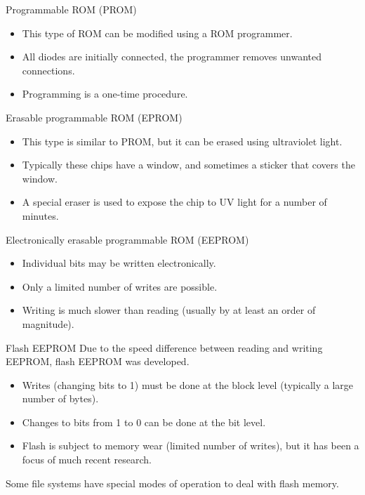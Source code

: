 \begin{frame}{Programmable ROM (PROM)}
  \begin{itemize}
    \item This type of ROM can be modified using a ROM programmer.
    \item All diodes are initially connected, the programmer removes unwanted connections.
    \item Programming is a one-time procedure.
  \end{itemize}
\end{frame}

\begin{frame}{Erasable programmable ROM (EPROM)}
  \begin{itemize}
    \item This type is similar to PROM, but it can be erased using ultraviolet light.
    \item Typically these chips have a window, and sometimes a sticker that covers the window.
    \item A special eraser is used to expose the chip to UV light for a number of minutes.
  \end{itemize}
\end{frame}

\begin{frame}{Electronically erasable programmable ROM (EEPROM)}
  \begin{itemize}
    \item Individual bits may be written electronically.
    \item Only a limited number of writes are possible.
    \item Writing is much slower than reading (usually by at least an order of magnitude).
  \end{itemize}
\end{frame}

\begin{frame}{Flash EEPROM}
  Due to the speed difference between reading and writing EEPROM, flash EEPROM was developed.
  \begin{itemize}
    \item Writes (changing bits to 1) must be done at the block level (typically a large number of bytes).
    \item Changes to bits from 1 to 0 can be done at the bit level.
    \item Flash is subject to memory wear (limited number of writes), but it has been a focus of much recent research.
  \end{itemize}
  Some file systems have special modes of operation to deal with flash memory.
\end{frame}

